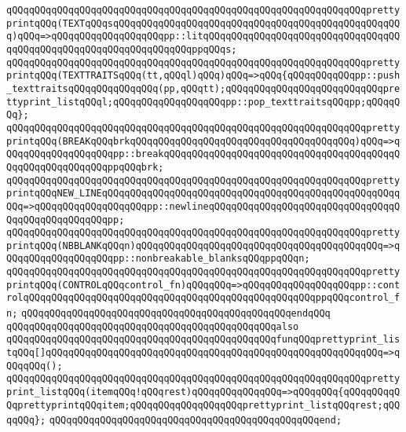 \verb|qQQqqQQqqQQqqQQqqQQqqQQqqQQqqQQqqQQqqQQqqQQqqQQqqQQqqQQqqQQqqQQqprettyprintqQQq(TEXTqQQqsqQQqqQQqqQQqqQQqqQQqqQQqqQQqqQQqqQQqqQQqqQQqqQQqqQQq)qQQq=>qQQqqQQqqQQqqQQqqQQqpp::litqQQqqQQqqQQqqQQqqQQqqQQqqQQqqQQqqQQqqQQqqQQqqQQqqQQqqQQqqQQqqQQqqQQqppqQQqs;|\newline
\verb|qQQqqQQqqQQqqQQqqQQqqQQqqQQqqQQqqQQqqQQqqQQqqQQqqQQqqQQqqQQqqQQqprettyprintqQQq(TEXTTRAITSqQQq(tt,qQQql)qQQq)qQQq=>qQQq{qQQqqQQqqQQqpp::push_texttraitsqQQqqQQqqQQqqQQq(pp,qQQqtt);qQQqqQQqqQQqqQQqqQQqqQQqqQQqprettyprint_listqQQql;qQQqqQQqqQQqqQQqqQQqpp::pop_texttraitsqQQqpp;qQQqqQQq};|\newline
\verb|qQQqqQQqqQQqqQQqqQQqqQQqqQQqqQQqqQQqqQQqqQQqqQQqqQQqqQQqqQQqqQQqprettyprintqQQq(BREAKqQQqbrkqQQqqQQqqQQqqQQqqQQqqQQqqQQqqQQqqQQqqQQq)qQQq=>qQQqqQQqqQQqqQQqqQQqpp::breakqQQqqQQqqQQqqQQqqQQqqQQqqQQqqQQqqQQqqQQqqQQqqQQqqQQqqQQqqQQqppqQQqbrk;|\newline
\verb|qQQqqQQqqQQqqQQqqQQqqQQqqQQqqQQqqQQqqQQqqQQqqQQqqQQqqQQqqQQqqQQqprettyprintqQQqNEW_LINEqQQqqQQqqQQqqQQqqQQqqQQqqQQqqQQqqQQqqQQqqQQqqQQqqQQqqQQq=>qQQqqQQqqQQqqQQqqQQqpp::newlineqQQqqQQqqQQqqQQqqQQqqQQqqQQqqQQqqQQqqQQqqQQqqQQqqQQqpp;|\newline
\verb|qQQqqQQqqQQqqQQqqQQqqQQqqQQqqQQqqQQqqQQqqQQqqQQqqQQqqQQqqQQqqQQqprettyprintqQQq(NBBLANKqQQqn)qQQqqQQqqQQqqQQqqQQqqQQqqQQqqQQqqQQqqQQqqQQq=>qQQqqQQqqQQqqQQqqQQqpp::nonbreakable_blanksqQQqppqQQqn;|\newline
\verb|qQQqqQQqqQQqqQQqqQQqqQQqqQQqqQQqqQQqqQQqqQQqqQQqqQQqqQQqqQQqqQQqprettyprintqQQq(CONTROLqQQqcontrol_fn)qQQqqQQq=>qQQqqQQqqQQqqQQqqQQqpp::controlqQQqqQQqqQQqqQQqqQQqqQQqqQQqqQQqqQQqqQQqqQQqqQQqqQQqppqQQqcontrol_fn;|\newline
\verb|qQQqqQQqqQQqqQQqqQQqqQQqqQQqqQQqqQQqqQQqqQQqqQQqendqQQq|\newline
\newline
\verb|qQQqqQQqqQQqqQQqqQQqqQQqqQQqqQQqqQQqqQQqqQQqqQQqalso|\newline
\verb|qQQqqQQqqQQqqQQqqQQqqQQqqQQqqQQqqQQqqQQqqQQqqQQqfunqQQqprettyprint_listqQQq[]qQQqqQQqqQQqqQQqqQQqqQQqqQQqqQQqqQQqqQQqqQQqqQQqqQQqqQQqqQQq=>qQQqqQQq();|\newline
\verb|qQQqqQQqqQQqqQQqqQQqqQQqqQQqqQQqqQQqqQQqqQQqqQQqqQQqqQQqqQQqqQQqprettyprint_listqQQq(itemqQQq!qQQqrest)qQQqqQQqqQQqqQQq=>qQQqqQQq{qQQqqQQqqQQqprettyprintqQQqitem;qQQqqQQqqQQqqQQqqQQqprettyprint_listqQQqrest;qQQqqQQq};|\newline
\verb|qQQqqQQqqQQqqQQqqQQqqQQqqQQqqQQqqQQqqQQqqQQqqQQqend;|\newline
